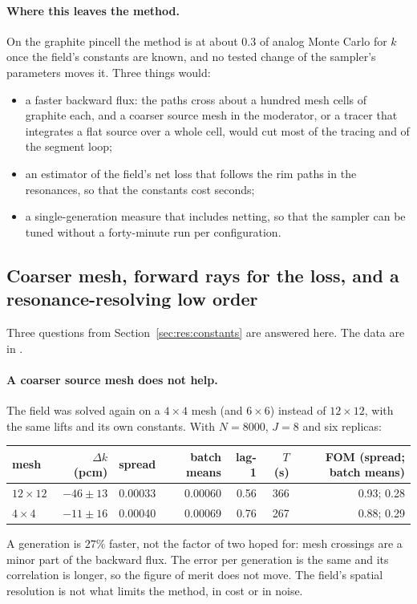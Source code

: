 \paragraph{Where this leaves the method.} On the graphite pincell the method is at about $0.3$ of
analog Monte Carlo for $k$ once the field's constants are known, and no tested change of the
sampler's parameters moves it. Three things would:
\begin{itemize}
\item a faster backward flux: the paths cross about a hundred mesh cells of graphite each, and a
  coarser source mesh in the moderator, or a tracer that integrates a flat source over a whole
  cell, would cut most of the tracing and of the segment loop;
\item an estimator of the field's net loss that follows the rim paths in the resonances, so that
  the constants cost seconds;
\item a single-generation measure that includes netting, so that the sampler can be tuned without a
  forty-minute run per configuration.
\end{itemize}

\subsection{Coarser mesh, forward rays for the loss, and a resonance-resolving low order}\label{sec:res:forward}

Three questions from Section~\ref{sec:res:constants} are answered here. The data are in
.

\paragraph{A coarser source mesh does not help.} The field was solved again on a $4\times4$ mesh
(and $6\times6$) instead of $12\times12$, with the same lifts and its own constants. With
$N=8000$, $J=8$ and six replicas:
\begin{center}\small
\begin{tabular}{@{}lrrrrrr@{}}
\toprule
mesh & $\Delta k$ (pcm) & spread & batch means & lag-1 & $T$ (s) & FOM (spread; batch means)\\
\midrule
$12\times12$ & $-46\pm13$ & 0.00033 & 0.00060 & 0.56 & 366 & 0.93; 0.28\\
$4\times4$ & $-11\pm16$ & 0.00040 & 0.00069 & 0.76 & 267 & 0.88; 0.29\\
\bottomrule
\end{tabular}
\end{center}
A generation is $27\%$ faster, not the factor of two hoped for: mesh crossings are a minor part of
the backward flux. The error per generation is the same and its correlation is longer, so the
figure of merit does not move. The field's spatial resolution is not what limits the method, in
cost or in noise.

